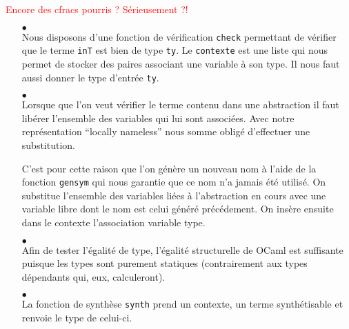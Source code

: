 \documentclass {article}
\newcommand{\codefrom}[3]
           {}
\theoremstyle{definition}
\theoremstyle{remark}
\newcommand{\todo}[1]{\textcolor{red}{#1}}
\newcommand{\fun}[1]{\lstinline!#1!}
\begin{document}
\todo{Encore des cfracs pourris ? Sérieusement ?!}
\begin{itemize}
  
\item[$\bullet$] \\
  
  Nous disposons d'une fonction de vérification \lstinline!check!
  permettant de vérifier que le terme \fun{inT} est bien de type
  \fun{ty}.
  Le \fun{contexte} est une liste qui nous permet de stocker
  des paires associant une variable à son type. Il nous faut aussi
  donner le type d'entrée \fun{ty}.
    
  
  
  \codefrom{typed}{lambda}{check_def} 
  
\item[$\bullet$]  \\
  

  Lorsque que l'on veut vérifier le terme contenu dans une abstraction il faut libérer l'ensemble des variables
  qui lui sont associées. Avec notre représentation ``locally nameless'' nous somme obligé d'effectuer une substitution.
  
  C'est pour cette raison que l'on génère un nouveau nom à l'aide de la fonction \fun{gensym} qui nous garantie
  que ce nom n'a jamais été utilisé. On substitue l'ensemble
  des variables liées à l'abstraction en cours avec une variable libre dont le nom est celui généré précédement.
  On insère ensuite dans le contexte l'association variable type.
  
%
 \codefrom{typed}{lambda}{check_abs}

\item[$\bullet$]  \\


Afin de tester l'égalité de type, l'égalité structurelle de OCaml est
suffisante puisque les types sont purement statiques (contrairement
aux types dépendants qui, eux, calculeront).
%
\codefrom{typed}{lambda}{check_inv}
  

\item[$\bullet$] \\

La fonction de synthèse \lstinline!synth! prend un contexte, un
terme synthétisable et renvoie le type de celui-ci.


\end{itemize}
\end{document}
